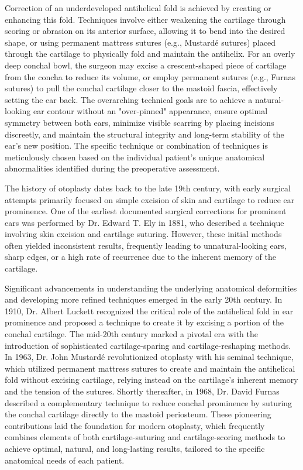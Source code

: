 Correction of an underdeveloped antihelical fold is achieved by creating or enhancing this fold. Techniques involve either weakening the cartilage through scoring or abrasion on its anterior surface, allowing it to bend into the desired shape, or using permanent mattress sutures (e.g., Mustard\'e sutures) placed through the cartilage to physically fold and maintain the antihelix. For an overly deep conchal bowl, the surgeon may excise a crescent-shaped piece of cartilage from the concha to reduce its volume, or employ permanent sutures (e.g., Furnas sutures) to pull the conchal cartilage closer to the mastoid fascia, effectively setting the ear back. The overarching technical goals are to achieve a natural-looking ear contour without an "over-pinned" appearance, ensure optimal symmetry between both ears, minimize visible scarring by placing incisions discreetly, and maintain the structural integrity and long-term stability of the ear's new position. The specific technique or combination of techniques is meticulously chosen based on the individual patient's unique anatomical abnormalities identified during the preoperative assessment.

The history of otoplasty dates back to the late 19th century, with early surgical attempts primarily focused on simple excision of skin and cartilage to reduce ear prominence. One of the earliest documented surgical corrections for prominent ears was performed by Dr. Edward T. Ely in 1881, who described a technique involving skin excision and cartilage suturing. However, these initial methods often yielded inconsistent results, frequently leading to unnatural-looking ears, sharp edges, or a high rate of recurrence due to the inherent memory of the cartilage.

Significant advancements in understanding the underlying anatomical deformities and developing more refined techniques emerged in the early 20th century. In 1910, Dr. Albert Luckett recognized the critical role of the antihelical fold in ear prominence and proposed a technique to create it by excising a portion of the conchal cartilage. The mid-20th century marked a pivotal era with the introduction of sophisticated cartilage-sparing and cartilage-reshaping methods. In 1963, Dr. John Mustard\'e revolutionized otoplasty with his seminal technique, which utilized permanent mattress sutures to create and maintain the antihelical fold without excising cartilage, relying instead on the cartilage's inherent memory and the tension of the sutures. Shortly thereafter, in 1968, Dr. David Furnas described a complementary technique to reduce conchal prominence by suturing the conchal cartilage directly to the mastoid periosteum. These pioneering contributions laid the foundation for modern otoplasty, which frequently combines elements of both cartilage-suturing and cartilage-scoring methods to achieve optimal, natural, and long-lasting results, tailored to the specific anatomical needs of each patient.

